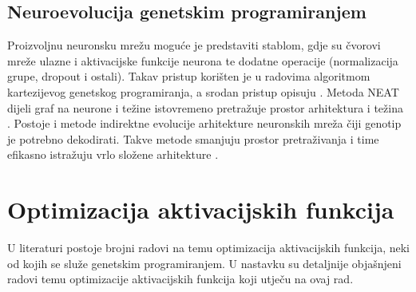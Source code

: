 \documentclass[times, utf8, numeric, diplomski]{fer}
\def\TODO#1{\noindent\textcolor{red}{TODO: \textit{#1}}\newline}
\def\todo#1{\TODO{#1}}
\begin{document}
%

\subsection{Neuroevolucija genetskim programiranjem}
Proizvoljnu neuronsku mrežu moguće je predstaviti stablom, gdje su čvorovi mreže ulazne i aktivacijske funkcije neurona te dodatne operacije (normalizacija grupe, dropout i ostali). Takav pristup korišten je u radovima \citep{evo_atari,evo_hetero_net} algoritmom kartezijevog genetskog programiranja, a srodan pristup opisuju \citet{mixed_cgp}. Metoda NEAT dijeli graf na neurone i težine istovremeno pretražuje prostor arhitektura i težina \citep{neat}. Postoje i metode indirektne evolucije arhitekture neuronskih mreža čiji genotip je potrebno dekodirati. Takve metode smanjuju prostor pretraživanja i time efikasno istražuju vrlo složene arhitekture \citep{gruau}.

%

\section{Optimizacija aktivacijskih funkcija}
U literaturi postoje brojni radovi na temu optimizacija aktivacijskih funkcija, neki od kojih se služe genetskim programiranjem. U nastavku su detaljnije objašnjeni radovi temu optimizacije aktivacijskih funkcija koji utječu na ovaj rad.
\end{document}
